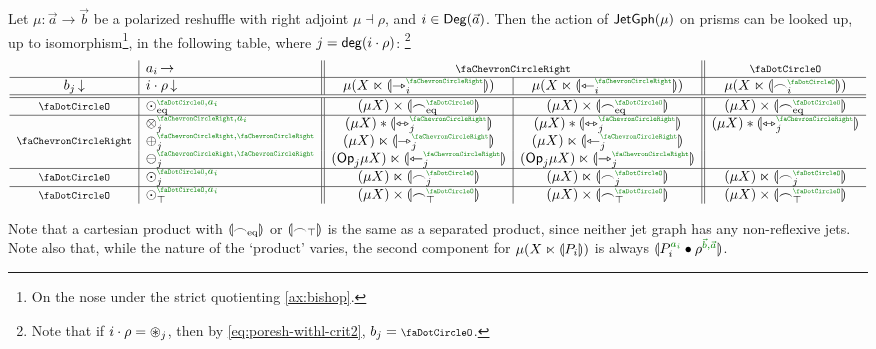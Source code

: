 \documentclass[a4paper]{memoir}
\begin{document}
\begin{proposition} \label{thm:poresh-jetgph-prism-commut}
	Let $\mu : \vec a \to \vec b$ be a polarized reshuffle with right adjoint $\mu \dashv \rho$, and $i \in {\mathsf{Deg}}(\vec a)$.
	Then the action of $\mathsf{JetGph}(\mu)$ on prisms can be looked up, up to isomorphism\footnote{On the nose under the strict quotienting \cref{ax:bishop}.}, in the following table, where $j = \mathsf{deg}(i \cdot \rho)$:%
	\footnote{Note that if $i \cdot \rho = {\oast}_j$, then by \cref{eq:poresh-withl-crit2}, $b_j = \npolar$.}
	\[
		\begin{array}{c | l || c | c || c}
			& a_i\,{\rightarrow} & \multicolumn{2}{c ||}{\ypolar} & \npolar \\ \hline
			{b_j}\,{\downarrow}
			& {i \cdot \rho}\,{\downarrow}
			& \mu(X \multip \rival{\jetsym_i\pmry})
			& \mu(X \multip \rival{\tejsym_i\pmry})
			& \mu(X \multip \rival{\edgesym_i\pmrn})
			\\ \hline \hline
			\npolar
			& \nonpol_\eqtydeg\pmrhom{\npolar}{a_i}
			& (\mu X) \times \rival{\eqtysym\pmrn}
			& (\mu X) \times \rival{\eqtysym\pmrn}
			& (\mu X) \times \rival{\eqtysym\pmrn}
			\\ \hline
			\multirow{3}{*}{$\ypolar$}
			& \mixpol_j\pmrhom{\ypolar}{a_i}
			& (\mu X) * \rival{\equijetsym_j\pmry}
			& (\mu X) * \rival{\equijetsym_j\pmry}
			& (\mu X) * \rival{\equijetsym_j\pmry}
			\\
			& \pospol_j\pmrhom{\ypolar}{\ypolar}
			& (\mu X) \multip \rival{\jetsym_j\pmry}
			& (\mu X) \multip \rival{\tejsym_j\pmry}
			&
			\\
			& \negpol_j\pmrhom{\ypolar}{\ypolar}
			& (\Op_j\mu X) \multip \rival{\tejsym_j\pmry}
			& (\Op_j\mu X) \multip \rival{\jetsym_j\pmry}
			&
			\\ \hline
			\npolar
			& \nonpol_j\pmrhom{\npolar}{a_i}
			& (\mu X) \multip \rival{\edgesym_j\pmrn}
			& (\mu X) \multip \rival{\edgesym_j\pmrn}
			& (\mu X) \multip \rival{\edgesym_j\pmrn}
			\\ \hline
			\npolar
			& \nonpol_\top\pmrhom{\npolar}{a_i}
			& (\mu X) \times \rival{\topsym\pmrn}
			& (\mu X) \times \rival{\topsym\pmrn}
			& (\mu X) \times \rival{\topsym\pmrn}
		\end{array}
	\]
\end{proposition}
Note that a cartesian product with ${\llparenthesis {\frown}_{{\mathrm{eq}}} \rrparenthesis}$ or ${\llparenthesis {\frown}_\top \rrparenthesis}$ is the same as a separated product, since neither jet graph has any non-reflexive jets.
Note also that, while the nature of the `product' varies, the second component for $\mu(X \ltimes {\llparenthesis P_i \rrparenthesis})$ is always $\rival{P_i\pmr{a_i} \oriof \rho\pmrhom{\vec b}{\vec a}}$.
\end{document}
